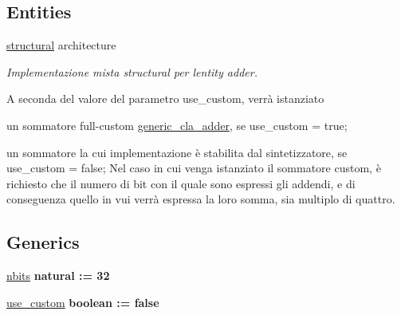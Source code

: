 \subsection*{Entities}
\begin{DoxyCompactItemize}
\item 
\hyperlink{classadder_1_1structural}{structural} architecture
\begin{DoxyCompactList}\small\item\em Implementazione mista structural per l\textquotesingle{}entity adder.

A seconda del valore del parametro use\+\_\+custom, verrà istanziato
\begin{DoxyItemize}
\item un sommatore full-\/custom \hyperlink{classgeneric__cla__adder}{generic\+\_\+cla\+\_\+adder}, se use\+\_\+custom = true;
\item un sommatore la cui implementazione è stabilita dal sintetizzatore, se use\+\_\+custom = false; Nel caso in cui venga istanziato il sommatore custom, è richiesto che il numero di bit con il quale sono espressi gli addendi, e di conseguenza quello in vui verrà espressa la loro somma, sia multiplo di quattro. 
\end{DoxyItemize}\end{DoxyCompactList}\end{DoxyCompactItemize}
\subsection*{Generics}
 \begin{DoxyCompactItemize}
\item 
\hyperlink{group___adder_gae1435c07d0cd54b521535e2f8de6f94e}{nbits} {\bfseries {\bfseries \textcolor{vhdlchar}{natural}\textcolor{vhdlchar}{ }\textcolor{vhdlchar}{ }\textcolor{vhdlchar}{\+:}\textcolor{vhdlchar}{=}\textcolor{vhdlchar}{ }\textcolor{vhdlchar}{ } \textcolor{vhdldigit}{32} \textcolor{vhdlchar}{ }}}
\item 
\hyperlink{group___adder_gadf05ca347ec6d3c85740dc697469b3db}{use\+\_\+custom} {\bfseries {\bfseries \textcolor{vhdlchar}{boolean}\textcolor{vhdlchar}{ }\textcolor{vhdlchar}{ }\textcolor{vhdlchar}{\+:}\textcolor{vhdlchar}{=}\textcolor{vhdlchar}{ }\textcolor{vhdlchar}{ }\textcolor{vhdlchar}{ }\textcolor{vhdlchar}{ }\textcolor{vhdlchar}{false}\textcolor{vhdlchar}{ }}}
\end{DoxyCompactItemize}

